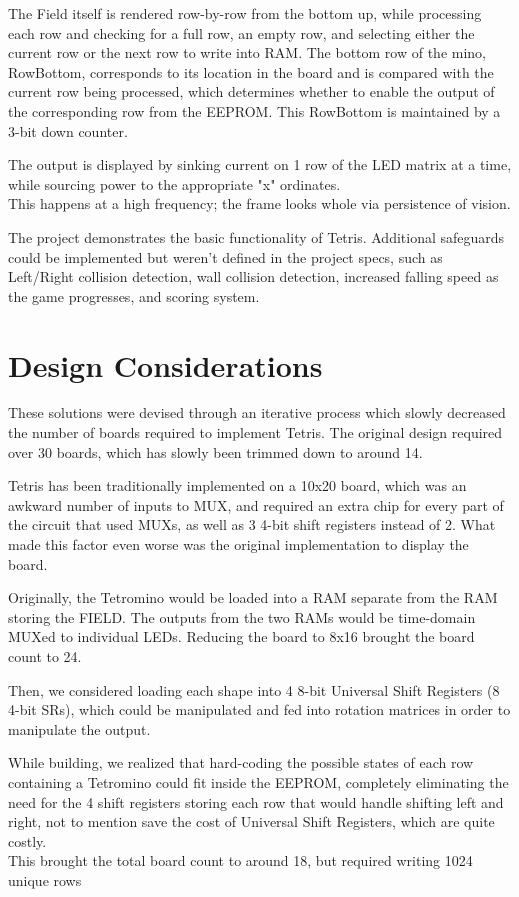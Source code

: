 \documentclass[letterpaper,titlepage,oneside]{article}
\begin{document}
The Field itself is rendered row-by-row from the bottom up, while processing each row and checking for a full row, an empty row, and selecting either the current row or the next row to write into RAM. The bottom row of the mino, RowBottom, corresponds to its location in the board and is compared with the current row being processed, which determines whether to enable the output of the corresponding row from the EEPROM. This RowBottom is maintained by a 3-bit down counter.

The output is displayed by sinking current on 1 row of the LED matrix at a time, while sourcing power to the appropriate "x" ordinates. \\
This happens at a high frequency; the frame looks whole via persistence of vision.

The project demonstrates the basic functionality of Tetris. Additional safeguards could be implemented but weren't defined in the project specs, such as Left/Right collision detection, wall collision detection, increased falling speed as the game progresses, and scoring system.
\pagebreak
\section{Design Considerations}

These solutions were devised through an iterative process which slowly decreased the number of boards required to implement Tetris. The original design required over 30 boards, which has slowly been trimmed down to around 14. 

Tetris has been traditionally implemented on a 10x20 board, which was an awkward number of inputs to MUX, and required an extra chip for every part of the circuit that used MUXs, as well as 3 4-bit shift registers instead of 2. What made this factor even worse was the original implementation to display the board.

Originally, the Tetromino would be loaded into a RAM separate from the RAM storing the FIELD. The outputs from the two RAMs would be time-domain MUXed to individual LEDs. Reducing the board to 8x16 brought the board count to 24. 

Then, we considered loading each shape into 4 8-bit Universal Shift Registers (8 4-bit SRs), which could be manipulated and fed into rotation matrices in order to manipulate the output. 

While building, we realized that hard-coding the possible states of each row containing a Tetromino could fit inside the EEPROM, completely eliminating the need for the 4 shift registers storing each row that would handle shifting left and right, not to mention save the cost of Universal Shift Registers, which are quite costly. \\
This brought the total board count to around 18, but required writing 1024 unique rows
\end{document}
